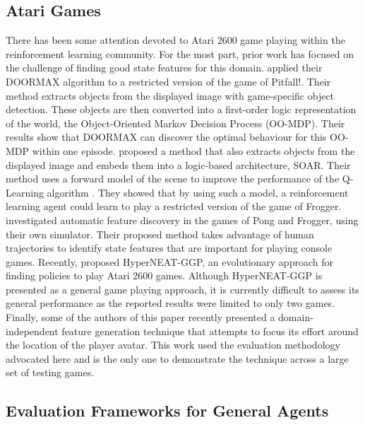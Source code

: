 \documentclass[twoside,11pt]{article}
\newcommand{\gamename}[1]{{\sc #1}}
\begin{document}
\subsection{Atari Games}\label{sec:prior_work_on_atari}

There has been some attention devoted to Atari 2600 game playing within the reinforcement learning community.
For the most part, prior work has focused on the challenge of finding good state features for this domain. 
 applied their DOORMAX algorithm to a restricted version of the game of \gamename{Pitfall!}.
Their method extracts objects from the displayed image with game-specific object detection. 
These objects are then converted into a first-order logic representation of the world, the Object-Oriented Markov Decision Process (OO-MDP). 
Their results show that DOORMAX can discover the optimal behaviour for this OO-MDP within one episode.
 proposed a method that also extracts objects from the displayed image and embeds them into a logic-based architecture, SOAR. 
Their method uses a forward model of the scene to improve the performance of the Q-Learning algorithm \cite{watkins1992}. 
They showed that by using such a model, a reinforcement learning agent could learn to play a restricted version of the game of \gamename{Frogger}.
 investigated automatic feature discovery in the games of \gamename{Pong} and \gamename{Frogger}, using their own simulator. 
Their proposed method takes advantage of human trajectories to identify state features that are important for playing console games. 
Recently,  proposed HyperNEAT-GGP, an evolutionary approach for finding policies to play Atari 2600 games. 
Although HyperNEAT-GGP is presented as a general game playing approach, it is currently difficult to assess its general performance as the reported results were limited to only two games. 
Finally, some of the authors of this paper \cite{bellemare2012} recently presented a domain-independent feature generation technique that attempts to focus its effort around the location of the player avatar.
This work used the evaluation methodology advocated here and is the only one to demonstrate the technique across a large set of testing games.

\subsection{Evaluation Frameworks for General Agents}
\end{document}
